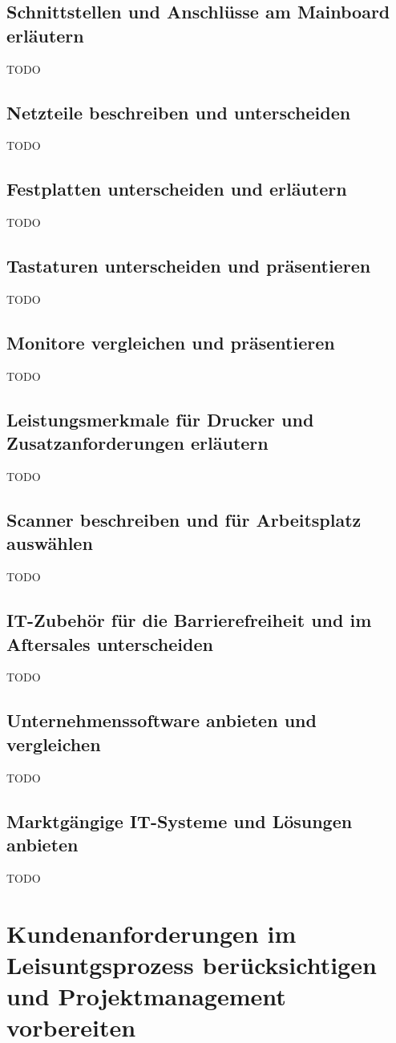 \documentclass[11pt]{article}
\begin{document}
\subsection{Schnittstellen und Anschlüsse am Mainboard erläutern}
    TODO
\subsection{Netzteile beschreiben und unterscheiden}
    TODO
\subsection{Festplatten unterscheiden und erläutern}
    TODO
\subsection{Tastaturen unterscheiden und präsentieren}
    TODO
\subsection{Monitore vergleichen und präsentieren}
    TODO
\subsection{Leistungsmerkmale für Drucker und Zusatzanforderungen erläutern}
    TODO
\subsection{Scanner beschreiben und für Arbeitsplatz auswählen}
    TODO
\subsection{IT-Zubehör für die Barrierefreiheit und im Aftersales unterscheiden}
    TODO
\subsection{Unternehmenssoftware anbieten und vergleichen}
    TODO
\subsection{Marktgängige IT-Systeme und Lösungen anbieten}
    TODO

\newpage
\section{Kundenanforderungen im Leisuntgsprozess berücksichtigen und Projektmanagement vorbereiten}
\end{document}
